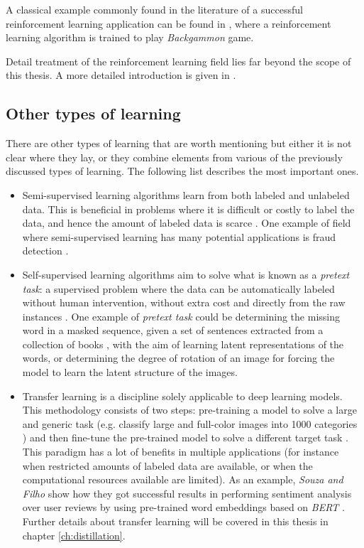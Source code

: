 A classical example commonly found in the literature of a successful reinforcement learning application can be found in \autocite{tesauro1994}, where a reinforcement learning algorithm is trained to play \textit{Backgammon} game.

Detail treatment of the reinforcement learning field lies far beyond the scope of this thesis. A more detailed introduction is given in \autocite{sutton2018, szepesvari2010}.

\subsection{Other types of learning} \label{sec:typesoflearning_others}
There are other types of learning \autocite{raghu2020} that are worth mentioning but either it is not clear where they lay, or they combine elements from various of the previously discussed types of learning. The following list describes the most important ones.
\begin{itemize}
	\item Semi-supervised learning algorithms learn from both labeled and unlabeled data. This is beneficial in problems where it is difficult or costly to label the data, and hence the amount of labeled data is scarce \autocite{raghu2020}. One example of field where semi-supervised learning has many potential applications is fraud detection \autocite{wang2020b}.
	\item Self-supervised learning algorithms aim to solve what is known as a \textit{pretext task}: a supervised problem where the data can be automatically labeled without human intervention, without extra cost and directly from the raw instances \autocite{raghu2020}. One example of \textit{pretext task} could be determining the missing word in a masked sequence, given a set of sentences extracted from a collection of books \autocite{devlin2019}, with the aim of learning latent representations of the words, or determining the degree of rotation of an image \autocite{gidaris2018} for forcing the model to learn the latent structure of the images.
	\item Transfer learning is a discipline solely applicable to deep learning models. This methodology consists of two steps: pre-training a model to solve a large and generic task (e.g. classify large and full-color images into 1000 categories \autocite{deng2009imagenet}) and then fine-tune the pre-trained model to solve a different target task \autocite{raghu2020}. This paradigm has a lot of benefits in multiple applications (for instance when restricted amounts of labeled data are available, or when the computational resources available are limited). As an example, \textit{Souza and Filho} \autocite{souza2022} show how they got successful results in performing sentiment analysis over user reviews by using pre-trained word embeddings based on \textit{BERT} \autocite{devlin2019}. Further details about transfer learning will be covered in this thesis in chapter \ref{ch:distillation}.
\end{itemize}


